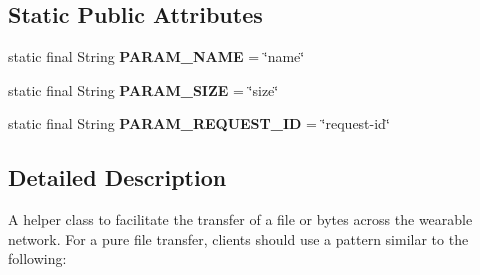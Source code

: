 \subsection*{Static Public Attributes}
\begin{DoxyCompactItemize}
\item 
static final String {\bfseries P\+A\+R\+A\+M\+\_\+\+N\+A\+ME} = \char`\"{}name\char`\"{}\hypertarget{classcom_1_1google_1_1devrel_1_1wcl_1_1connectivity_1_1WearFileTransfer_abaef335a9bc31e88d82a74c4dc0850ba}{}\label{classcom_1_1google_1_1devrel_1_1wcl_1_1connectivity_1_1WearFileTransfer_abaef335a9bc31e88d82a74c4dc0850ba}

\item 
static final String {\bfseries P\+A\+R\+A\+M\+\_\+\+S\+I\+ZE} = \char`\"{}size\char`\"{}\hypertarget{classcom_1_1google_1_1devrel_1_1wcl_1_1connectivity_1_1WearFileTransfer_af77b2bd223527b4fbcd9e24f518b01d9}{}\label{classcom_1_1google_1_1devrel_1_1wcl_1_1connectivity_1_1WearFileTransfer_af77b2bd223527b4fbcd9e24f518b01d9}

\item 
static final String {\bfseries P\+A\+R\+A\+M\+\_\+\+R\+E\+Q\+U\+E\+S\+T\+\_\+\+ID} = \char`\"{}request-\/id\char`\"{}\hypertarget{classcom_1_1google_1_1devrel_1_1wcl_1_1connectivity_1_1WearFileTransfer_a19026824640f32875851a0eb7db5fd05}{}\label{classcom_1_1google_1_1devrel_1_1wcl_1_1connectivity_1_1WearFileTransfer_a19026824640f32875851a0eb7db5fd05}

\end{DoxyCompactItemize}


\subsection{Detailed Description}
A helper class to facilitate the transfer of a file or bytes across the wearable network. For a pure file transfer, clients should use a pattern similar to the following\+:

